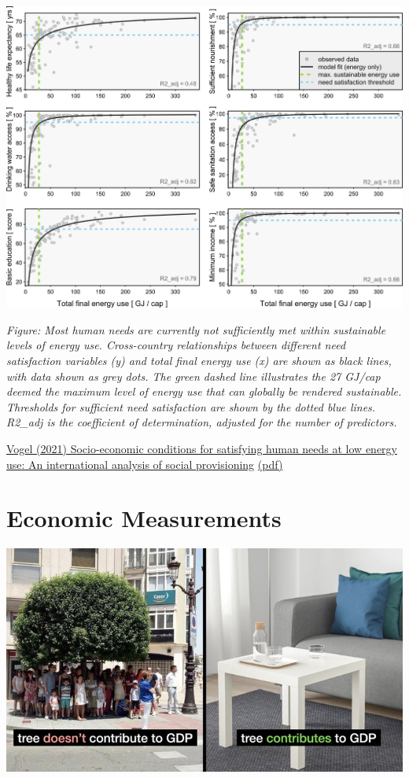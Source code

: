 \documentclass[
]{book}
\begin{document}
\includegraphics{fig/Vogel_fig2.jpg}

\emph{Figure: Most human needs are currently not sufficiently met within sustainable levels of energy use. Cross-country relationships between different need satisfaction
variables (y) and total final energy use (x) are shown as black lines, with data shown as grey dots. The green dashed line illustrates the 27 GJ/cap deemed the
maximum level of energy use that can globally be rendered sustainable. Thresholds for sufficient need satisfaction are shown by the dotted blue
lines. R2\_adj is the coefficient of determination, adjusted for the number of predictors.}

\href{https://www.sciencedirect.com/science/article/pii/S0959378021000662}{Vogel (2021) Socio-economic conditions for satisfying human needs at low energy use: An international analysis of social provisioning}
\href{pdf/Vogel_2021_Social_Provisoning_of_Needs.pdf}{(pdf)}

\hypertarget{economic-measurements}{%
\chapter{Economic Measurements}\label{economic-measurements}}

\includegraphics{fig/Tree_GDP.jpeg}
\end{document}

